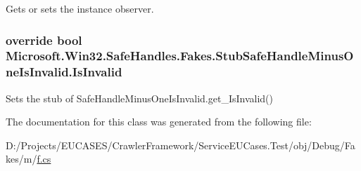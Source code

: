 Gets or sets the instance observer.

\hypertarget{class_microsoft_1_1_win32_1_1_safe_handles_1_1_fakes_1_1_stub_safe_handle_minus_one_is_invalid_a976eb64a1ca377a512ac0a7d74a69915}{
\subsubsection[{Is\-Invalid}]{\setlength{\rightskip}{0pt plus 5cm}override bool Microsoft.\-Win32.\-Safe\-Handles.\-Fakes.\-Stub\-Safe\-Handle\-Minus\-One\-Is\-Invalid.\-Is\-Invalid\hspace{0.3cm}{\ttfamily [get]}}}\label{class_microsoft_1_1_win32_1_1_safe_handles_1_1_fakes_1_1_stub_safe_handle_minus_one_is_invalid_a976eb64a1ca377a512ac0a7d74a69915}


Sets the stub of Safe\-Handle\-Minus\-One\-Is\-Invalid.\-get\-\_\-\-Is\-Invalid()



The documentation for this class was generated from the following file\-:\begin{DoxyCompactItemize}
\item 
D\-:/\-Projects/\-E\-U\-C\-A\-S\-E\-S/\-Crawler\-Framework/\-Service\-E\-U\-Cases.\-Test/obj/\-Debug/\-Fakes/m/\hyperlink{m_2f_8cs}{f.\-cs}\end{DoxyCompactItemize}
